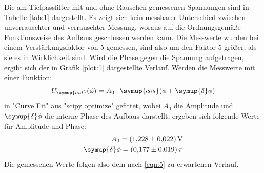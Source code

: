 Die am Tiefpassfilter mit und ohne Rauschen gemessenen Spannungen sind in Tabelle \ref{tab:1}
dargestellt. Es zeigt sich kein messbarer Unterschied zwischen unverrauschter und verrauschter Messung,
woraus auf die Ordnungsgemäße Funktionsweise des Aufbaus geschlossen werden kann.
Die Messwerte wurden bei einem Verstärkungsfaktor von 5 gemessen, sind also um den Faktor 5
größer, als sie es in Wirklichkeit sind. Wird die Phase gegen die Spannung
aufgetragen, ergibt sich der in Grafik \ref{plot:1} dargestellte Verlauf. Werden die Messwerte mit einer
Funktion:
\begin{equation*}
  U_{\symup{out}}(\phi) = A_0 \cdot \symup{cos}(\phi + \symup{\delta}\phi)
\end{equation*}
in "Curve Fit" aus "scipy optimize" gefittet, wobei $A_0$ die Amplitude und $\symup{\delta}\phi$ die interne Phase des Aufbaus darstellt,
ergeben sich folgende Werte für Amplitude und Phase:
\begin{equation*}
  \begin{split}
    A_0 = \SI{1.228(22)}{\volt} \\
    \symup{\delta}\phi = \SI{0.177(19)}{\pi}
  \end{split}
\end{equation*}
Die gemessenen Werte folgen also dem nach \eqref{eqn:5} zu erwartenen Verlauf.
